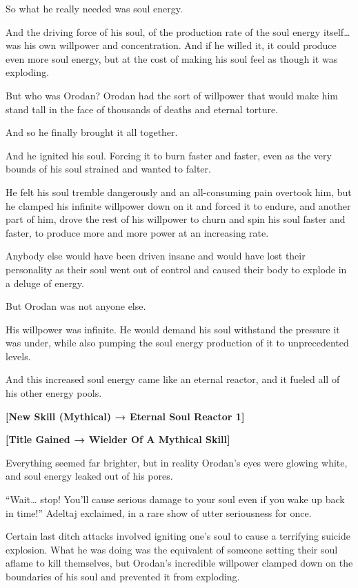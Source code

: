 \documentclass[a4paper,10pt]{book}
\begin{document}
So what he really needed was soul energy.\par
And the driving force of his soul, of the production rate of the soul energy itself… was his own willpower and concentration. And if he willed it, it could produce even more soul energy, but at the cost of making his soul feel as though it was exploding.\par
But who was Orodan? Orodan had the sort of willpower that would make him stand tall in the face of thousands of deaths and eternal torture.\par
And so he finally brought it all together.\par
And he ignited his soul. Forcing it to burn faster and faster, even as the very bounds of his soul strained and wanted to falter.\par
He felt his soul tremble dangerously and an all-consuming pain overtook him, but he clamped his infinite willpower down on it and forced it to endure, and another part of him, drove the rest of his willpower to churn and spin his soul faster and faster, to produce more and more power at an increasing rate.\par
Anybody else would have been driven insane and would have lost their personality as their soul went out of control and caused their body to explode in a deluge of energy.\par
But Orodan was not anyone else.\par
His willpower was infinite. He would demand his soul withstand the pressure it was under, while also pumping the soul energy production of it to unprecedented levels.\par
And this increased soul energy came like an eternal reactor, and it fueled all of his other energy pools.\par
\textbf{[New Skill (Mythical) → Eternal Soul Reactor 1]}\par
\textbf{[Title Gained → Wielder Of A Mythical Skill]}\par
Everything seemed far brighter, but in reality Orodan’s eyes were glowing white, and soul energy leaked out of his pores.\par
“Wait… stop! You’ll cause serious damage to your soul even if you wake up back in time!” Adeltaj exclaimed, in a rare show of utter seriousness for once.\par
Certain last ditch attacks involved igniting one's soul to cause a terrifying suicide explosion. What he was doing was the equivalent of someone setting their soul aflame to kill themselves, but Orodan’s incredible willpower clamped down on the boundaries of his soul and prevented it from exploding.\par
\end{document}
